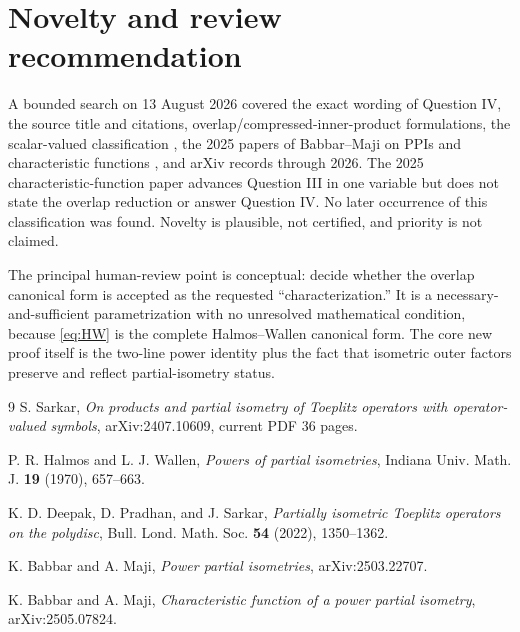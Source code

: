 \documentclass[11pt]{article}
\begin{document}
\section{Novelty and review recommendation}

A bounded search on 13 August 2026 covered the exact wording of Question IV,
the source title and citations, overlap/compressed-inner-product formulations,
the scalar-valued classification \cite{DeepakPradhanSarkar}, the 2025 papers
of Babbar--Maji on PPIs and characteristic functions
\cite{BabbarMajiPPI,BabbarMajiCF}, and arXiv records through 2026.  The 2025
characteristic-function paper advances Question III in one variable but does
not state the overlap reduction or answer Question IV.  No later occurrence
of this classification was found.  Novelty is plausible, not certified, and
priority is not claimed.

The principal human-review point is conceptual: decide whether the overlap
canonical form is accepted as the requested ``characterization.''  It is a
necessary-and-sufficient parametrization with no unresolved mathematical
condition, because \eqref{eq:HW} is the complete Halmos--Wallen canonical
form.  The core new proof itself is the two-line power identity plus the fact
that isometric outer factors preserve and reflect partial-isometry status.

\begin{thebibliography}{9}
S. Sarkar, \emph{On products and partial isometry of Toeplitz operators with
operator-valued symbols}, arXiv:2407.10609, current PDF 36 pages.

P. R. Halmos and L. J. Wallen, \emph{Powers of partial isometries}, Indiana
Univ. Math. J. \textbf{19} (1970), 657--663.

K. D. Deepak, D. Pradhan, and J. Sarkar, \emph{Partially isometric Toeplitz
operators on the polydisc}, Bull. Lond. Math. Soc. \textbf{54} (2022),
1350--1362.

K. Babbar and A. Maji, \emph{Power partial isometries}, arXiv:2503.22707.

K. Babbar and A. Maji, \emph{Characteristic function of a power partial
isometry}, arXiv:2505.07824.
\end{thebibliography}
\end{document}
